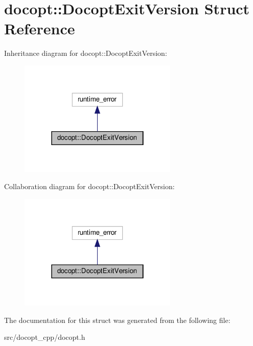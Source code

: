 \hypertarget{structdocopt_1_1DocoptExitVersion}{}\section{docopt\+:\+:Docopt\+Exit\+Version Struct Reference}
\label{structdocopt_1_1DocoptExitVersion}


Inheritance diagram for docopt\+:\+:Docopt\+Exit\+Version\+:
\nopagebreak
\begin{figure}[H]
\begin{center}
\leavevmode
\includegraphics[width=214pt]{structdocopt_1_1DocoptExitVersion__inherit__graph}
\end{center}
\end{figure}


Collaboration diagram for docopt\+:\+:Docopt\+Exit\+Version\+:
\nopagebreak
\begin{figure}[H]
\begin{center}
\leavevmode
\includegraphics[width=214pt]{structdocopt_1_1DocoptExitVersion__coll__graph}
\end{center}
\end{figure}


The documentation for this struct was generated from the following file\+:\begin{DoxyCompactItemize}
\item 
src/docopt\+\_\+cpp/docopt.\+h\end{DoxyCompactItemize}
